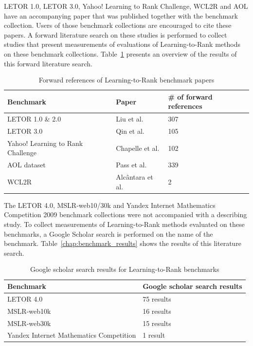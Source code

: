 LETOR 1.0, LETOR 3.0, Yahoo! Learning to Rank Challenge, WCL2R and AOL have an accompanying paper that was published together with the benchmark collection. Users of those benchmark collections are encouraged to cite these papers. A forward literature search on these studies is performed to collect studies that present measurements of evaluations of Learning-to-Rank methods on these benchmark collections. Table~\ref{tbl:ltr_benchmark_forref} presents an overview of the results of this forward literature search.

\begin{table}[!h]
\begin{tabular}{l|l|l}
Benchmark & Paper & \# of forward references \\
\hline
LETOR 1.0 \& 2.0 & Liu et al. \cite{Liu2007b} & 307\\
LETOR 3.0 & Qin et al. \cite{Qin2010} & 105\\
Yahoo! Learning to Rank Challenge & Chapelle et al. \cite{Chapelle2011a} & 102\\
AOL dataset & Pass et al. \cite{Pass2006} & 339\\
WCL2R & Alc{\^a}ntara et al. \cite{Alcantara2010} & 2\\
\end{tabular}
\caption{Forward references of Learning-to-Rank benchmark papers}
\label{tbl:ltr_benchmark_forref}
\end{table}

The LETOR 4.0, MSLR-web10/30k and Yandex Internet Mathematics Competition 2009 benchmark collections were not accompanied with a describing study. To collect measurements of Learning-to-Rank methods evaluated on these benchmarks, a Google Scholar search is performed on the name of the benchmark. Table~\ref{chap:benchmark_results} shows the results of this literature search.

\begin{table}[!h]
\begin{tabular}{l|l}
Benchmark & Google scholar search results \\
\hline
LETOR 4.0 & 75 results \\
MSLR-web10k & 16 results \\
MSLR-web30k & 15 results \\
Yandex Internet Mathematics Competition & 1 result \\ 
\end{tabular}
\caption{Google scholar search results for Learning-to-Rank benchmarks}
\label{tbl:ltr_benchmark_searchres}
\end{table}

